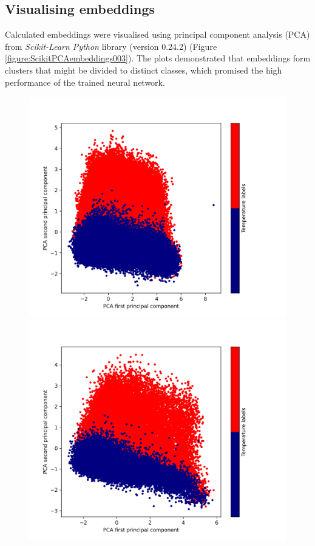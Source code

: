 \documentclass[12pt]{article}
\begin{document}
	\subsection{Visualising embeddings}

	Calculated embeddings were visualised using principal component 
	analysis (PCA) from \textit{Scikit-Learn Python} library (version 0.24.2)
	(Figure \ref{figure:ScikitPCAembeddings003}). The plots demonstrated that
	embeddings form clusters that might be divided to distinct classes, which
	promised the high performance of the trained neural network.

	\begin{figure}[h!]
		\centering
		\includegraphics[scale=0.45]{003_train_v2_PCA.png}
		\includegraphics[scale=0.45]{003_validate_v2_PCA.png}


\end{figure}
\end{document}
